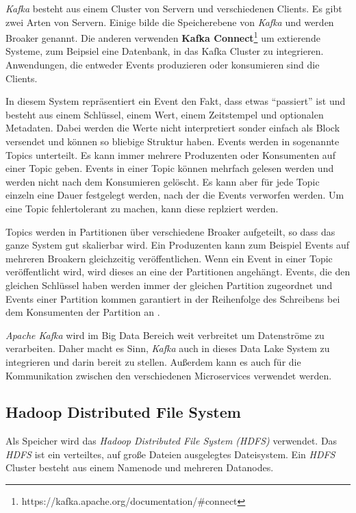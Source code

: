 \textit{Kafka} besteht aus einem Cluster von Servern und verschiedenen Clients.
Es gibt zwei Arten von Servern.
Einige bilde die Speicherebene von \textit{Kafka} und werden Broaker genannt.
Die anderen verwenden \textbf{Kafka Connect}\footnote{https://kafka.apache.org/documentation/\#connect} um extierende Systeme, zum Beipsiel eine Datenbank, in das Kafka Cluster zu integrieren.
Anwendungen, die entweder Events produzieren oder konsumieren sind die Clients.

In diesem System repräsentiert ein Event den Fakt, dass etwas "`passiert"' ist und besteht aus einem Schlüssel, einem Wert, einem Zeitstempel und optionalen Metadaten.
Dabei werden die Werte nicht interpretiert sonder einfach als Block versendet und können so bliebige Struktur haben.
Events werden in sogenannte Topics unterteilt.
Es kann immer mehrere Produzenten oder Konsumenten auf einer Topic geben.
Events in einer Topic können mehrfach gelesen werden und werden nicht nach dem Konsumieren gelöscht.
Es kann aber für jede Topic einzeln eine Dauer festgelegt werden, nach der die Events verworfen werden.
Um eine Topic fehlertolerant zu machen, kann diese replziert werden.

Topics werden in Partitionen über verschiedene Broaker aufgeteilt, so dass das ganze System gut skalierbar wird.
Ein Produzenten kann zum Beispiel Events auf mehreren Broakern gleichzeitig veröffentlichen.
Wenn ein Event in einer Topic veröffentlicht wird, wird dieses an eine der Partitionen angehängt.
Events, die den gleichen Schlüssel haben werden immer der gleichen Partition zugeordnet und Events einer Partition kommen garantiert in der Reihenfolge des Schreibens bei dem Konsumenten der Partition an \parencite{kafka-docs}.

\textit{Apache Kafka} wird im Big Data Bereich weit verbreitet um Datenströme zu verarbeiten.
Daher macht es Sinn, \textit{Kafka} auch in dieses Data Lake System zu integrieren und darin bereit zu stellen.
Außerdem kann es auch für die Kommunikation zwischen den verschiedenen Microservices verwendet werden.

\subsection{Hadoop Distributed File System}

Als Speicher wird das \textit{Hadoop Distributed File System (HDFS)} verwendet.
Das \textit{HDFS} ist ein verteiltes, auf große Dateien ausgelegtes Dateisystem.
Ein \textit{HDFS} Cluster besteht aus einem Namenode und mehreren Datanodes.

